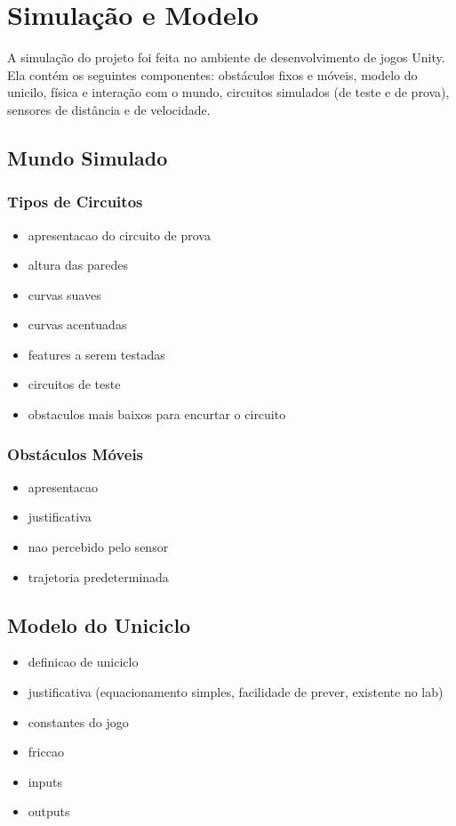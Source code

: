 \chapter{Simulação e Modelo}
\label{ch10}

A simulação do projeto foi feita no ambiente de desenvolvimento de jogos Unity. Ela contém os seguintes componentes: obstáculos fixos e móveis, modelo do unicilo, física e interação com o mundo, circuitos simulados (de teste e de prova), sensores de distância e de velocidade.

\section{Mundo Simulado}
\subsection{Tipos de Circuitos}

\begin{itemize}
  \item apresentacao do circuito de prova
  \item altura das paredes
  \item curvas suaves
  \item curvas acentuadas
  \item features a serem testadas
  \item circuitos de teste
  \item obstaculos mais baixos para encurtar o circuito
\end{itemize}

\subsection{Obstáculos Móveis}

\begin{itemize}
  \item apresentacao
  \item justificativa
  \item nao percebido pelo sensor
  \item trajetoria predeterminada
\end{itemize}

\section{Modelo do Uniciclo}

\begin{itemize}
  \item definicao de uniciclo
  \item justificativa (equacionamento simples, facilidade de prever, existente no lab)
  \item constantes do jogo
  \item friccao
  \item inputs
  \item outputs
\end{itemize}

